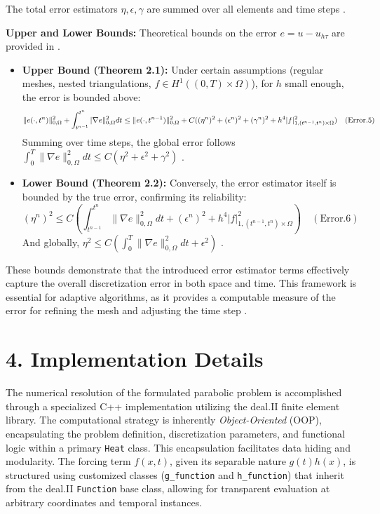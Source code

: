 \documentclass[
  11pt,
]{article}
\begin{document}
The total error estimators $\eta, \epsilon, \gamma$ are summed over all
elements and time steps \cite{picasso1998}.

\textbf{Upper and Lower Bounds:} Theoretical bounds on the error $e=u-u_{h\tau}$ are provided in \cite{picasso1998}. 
\begin{itemize}
\item
    \textbf{Upper Bound (Theorem 2.1):} Under certain assumptions (regular
    meshes, nested triangulations, $f \in H^1((0,T)\times\Omega)$), for
    $h$ small enough, the error is bounded above: \[
    \|e(\cdot,t^{n})\|_{0,\Omega}^{2}+\int_{t^{n-1}}^{t^{n}}\\|\nabla e\|_{0,\Omega}^{2}dt\le\|e(\cdot,t^{n-1})\|_{0,\Omega}^{2}+C((\eta^{n})^{2}+(\epsilon^{n})^{2}+(\gamma^{n})^{2}+h^{4}|f|_{1,(t^{n-1},t^{n})\times\Omega}^{2}) \quad (\text{Error.5})
    \] Summing over time steps, the global error follows
    $\int_{0}^{T}\|\nabla e\|_{0,\Omega}^{2}dt\le C(\eta^{2}+\epsilon^{2}+\gamma^{2})$
    \cite{picasso1998}. 
\item \textbf{Lower Bound (Theorem 2.2):} Conversely, the
    error estimator itself is bounded by the true error, confirming its
    reliability: \[
    (\eta^{n})^{2}\le C(\int_{t^{n-1}}^{t^{n}}\|\nabla e\|_{0,\Omega}^{2}dt+(\epsilon^{n})^{2}+h^{4}|f|_{1,(t^{n-1},t^{n})\times\Omega}^{2}) \quad (\text{Error.6})
    \] And globally,
    $\eta^{2}\le C(\int_{0}^{T}\|\nabla e\|_{0,\Omega}^{2}dt+\epsilon^{2})$
    \cite{picasso1998}.
\end{itemize}

These bounds demonstrate that the introduced error estimator terms
effectively capture the overall discretization error in both space and
time. This framework is essential for adaptive algorithms, as it
provides a computable measure of the error for refining the mesh and
adjusting the time step \cite{picasso1998}.

\section{4. Implementation Details}

The numerical resolution of the formulated parabolic problem is accomplished through a specialized C++ implementation utilizing the deal.II finite element library. The computational strategy is inherently \textit{Object-Oriented} (OOP), encapsulating the problem definition, discretization parameters, and functional logic within a primary \texttt{Heat} class. This encapsulation facilitates data hiding and modularity. The forcing term $f(x,t)$, given its separable nature $g(t)h(x)$, is structured using customized classes (\texttt{g\_function} and \texttt{h\_function}) that inherit from the deal.II \texttt{Function} base class, allowing for transparent evaluation at arbitrary coordinates and temporal instances.
\end{document}
